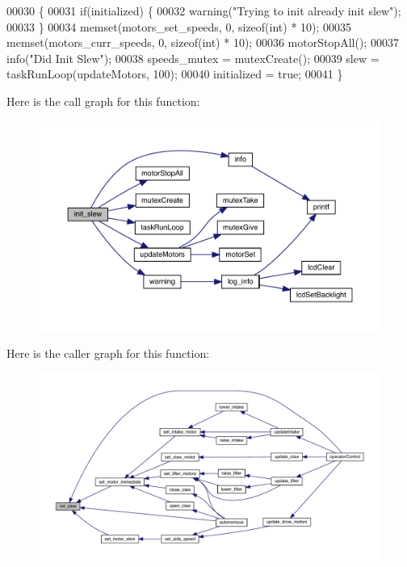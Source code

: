 \begin{DoxyCode}
00030                 \{
00031   \textcolor{keywordflow}{if}(initialized) \{
00032     warning(\textcolor{stringliteral}{"Trying to init already init slew"});
00033   \}
00034   memset(motors_set_speeds, 0, \textcolor{keyword}{sizeof}(\textcolor{keywordtype}{int}) * 10);
00035   memset(motors_curr_speeds, 0, \textcolor{keyword}{sizeof}(\textcolor{keywordtype}{int}) * 10);
00036   motorStopAll();
00037   info(\textcolor{stringliteral}{"Did Init Slew"});
00038   speeds_mutex = mutexCreate();
00039   slew = taskRunLoop(updateMotors, 100);
00040   initialized = \textcolor{keyword}{true};
00041 \}
\end{DoxyCode}
Here is the call graph for this function\+:\nopagebreak
\begin{figure}[H]
\begin{center}
\leavevmode
\includegraphics[width=350pt]{slew_8c_a321758941d88b75783955c819bb75005_cgraph}
\end{center}
\end{figure}
Here is the caller graph for this function\+:\nopagebreak
\begin{figure}[H]
\begin{center}
\leavevmode
\includegraphics[width=350pt]{slew_8c_a321758941d88b75783955c819bb75005_icgraph}
\end{center}
\end{figure}
\mbox{\label{slew_8c_a9f8b8ae577ef938622024545711f0151}} 
